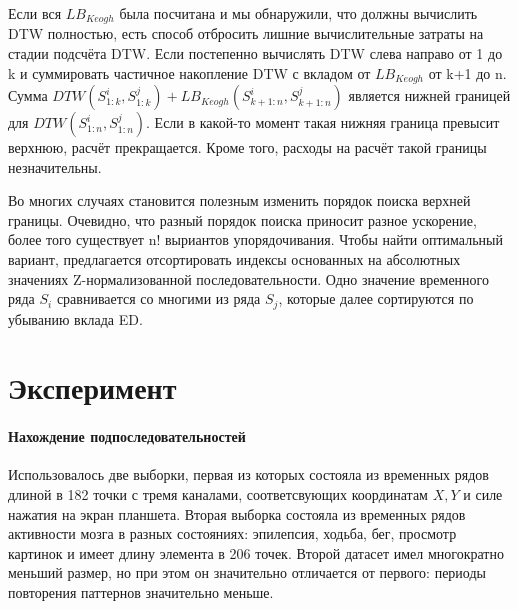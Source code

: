 \documentclass[12pt,twoside]{article}
\begin{document}
        Если вся $LB_{Keogh}$ была посчитана и мы обнаружили, что должны вычислить DTW полностью,
        есть способ отбросить лишние вычислительные затраты на стадии подсчёта DTW.
        Если постепенно вычислять DTW слева направо от 1 до k и суммировать частичное накопление DTW с вкладом от $LB_{Keogh}$ от k+1 до n.
        Сумма $DTW(S_{1:k}^i, S_{1:k}^j) + LB_{Keogh}(S_{k+1:n}^i, S_{k+1:n}^j)$ является нижней границей для $DTW(S_{1:n}^i, S_{1:n}^j)$.
        Если в какой-то момент такая нижняя граница превысит верхнюю, расчёт прекращается.
        Кроме того, расходы на расчёт такой границы незначительны.
        

        
        Во многих случаях становится полезным изменить порядок поиска верхней границы.
        Очевидно, что разный порядок поиска приносит разное ускорение, более того существует n! выриантов упорядочивания.
        Чтобы найти оптимальный вариант, предлагается отсортировать индексы основанных на абсолютных значениях Z-нормализованной последовательности.
        Одно значение временного ряда $S_i$ сравнивается со многими из ряда $S_j$, которые далее сортируются по убыванию вклада ED. 
						
    \section{Эксперимент}

        \paragraph{Нахождение подпоследовательностей}
        Использовалось две выборки, первая из которых состояла из временных рядов длиной в 182 точки с тремя каналами, соответсвующих координатам $X, Y$ 
            и силе нажатия на экран планшета.
        Вторая выборка состояла из временных рядов активности мозга в разных состояниях: эпилепсия, ходьба, бег, просмотр картинок и имеет длину элемента в 206 точек.
        Второй датасет имел многократно меньший размер, но при этом он значительно отличается от первого: периоды повторения паттернов значительно меньше.
\end{document}
